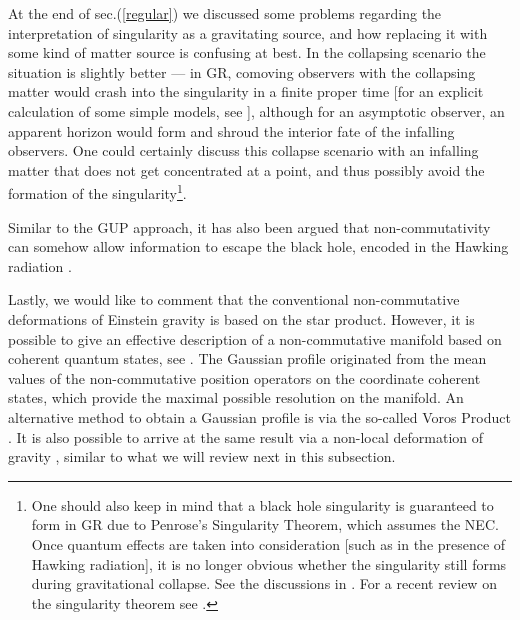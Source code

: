 \documentclass[12pt]{article}
\newcommand{\2}{$^2$}
\newcommand{\3}{$^3$}
\newcommand{\4}{$_4$}
\newcommand{\5}{$_5$}
\begin{document}
\begin{description}

At the end of sec.(\ref{regular}) we discussed some problems regarding the interpretation of singularity as a gravitating source, and how replacing it with some kind of matter source is confusing at best. In the collapsing scenario the situation is slightly better --- in GR, comoving observers with the collapsing matter would crash into the singularity in a finite proper time [for an explicit calculation of some simple models, see \cite{ABCL}], although for an asymptotic observer, an apparent horizon would form and shroud the interior fate of the infalling observers. One could certainly discuss this collapse scenario with an infalling matter that does not get concentrated at a point, and thus possibly avoid the formation of the singularity\footnote{One should also keep in mind that a black hole singularity is guaranteed to form in GR due to Penrose's Singularity Theorem, which assumes the NEC. Once quantum effects are taken into consideration [such as in the presence of Hawking radiation], it is no longer obvious whether the singularity still forms during gravitational collapse. See the discussions in \cite{9506052,1012.6038}. For a recent review on the singularity theorem see \cite{Senovilla-Garfinkle}.}.  

Similar to the GUP approach, it has also been argued that non-commutativity can somehow allow information to escape the black hole, encoded in the Hawking radiation \cite{1312.3032}. 

{\color{black}Lastly, we would like to comment that the conventional non-commutative deformations of
Einstein gravity is based on the star product. However, it is possible to give an effective description of a non-commutative manifold based on coherent quantum states, see \cite{0406174}. The Gaussian profile originated from the mean values of the non-commutative position operators on the
coordinate coherent states, which provide the maximal possible resolution on the manifold. An alternative method to obtain a Gaussian profile is via the so-called Voros Product \cite{0911.2123}. It is also possible to arrive at the same result via a non-local deformation of gravity \cite{1010.0680}, similar to what we will review next in this subsection.} 



\end{description}
\end{document}
